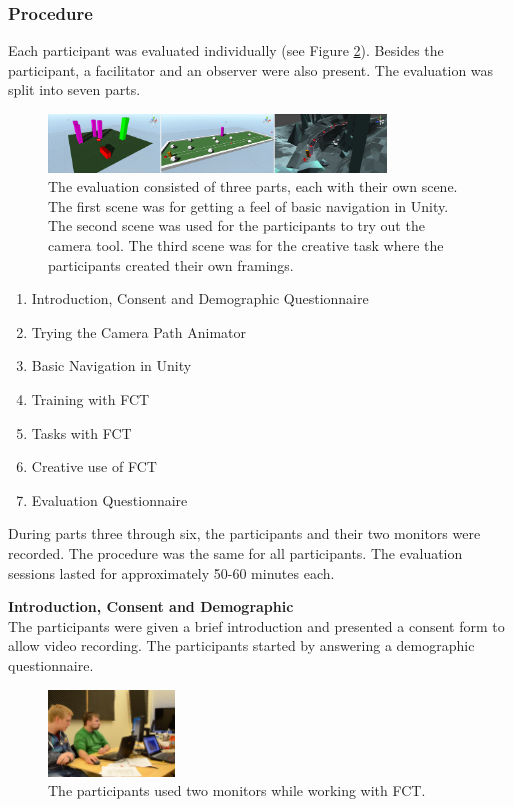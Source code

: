 \subsubsection{Procedure}
Each participant was evaluated individually (see Figure \ref{fig:tt}). Besides the participant, a facilitator and an observer were also present. The evaluation was split into seven parts. 
\begin{figure}[hbtp]
\centering
\includegraphics[width=0.8\textwidth]{Pics/sceneAll_horizontal}
\caption{The evaluation consisted of three parts, each with their own scene. The first scene was for getting a feel of basic navigation in Unity. The second scene was used for the participants to try out the camera tool. The third scene was for the creative task where the participants created their own framings.}
\label{fig:sceneAll}
\end{figure}

\begin{enumerate}
\item Introduction, Consent and Demographic Questionnaire
\item Trying the Camera Path Animator
\item Basic Navigation in Unity
\item Training with FCT
\item Tasks with FCT
\item Creative use of FCT
\item Evaluation Questionnaire
\end{enumerate}

During parts three through six, the participants and their two monitors were recorded. The procedure was the same for all participants. The evaluation sessions lasted for approximately 50-60 minutes each. 

\textbf{Introduction, Consent and Demographic}\\
The participants were given a brief introduction and presented a consent form to allow video recording. The participants started by answering a demographic questionnaire. 

\begin{figure}[htbp]
\centering
\includegraphics[width=0.3\textwidth]{Pics/test_setup}
\caption{The participants used two monitors while working with FCT.}
\label{fig:tt}
\end{figure}

